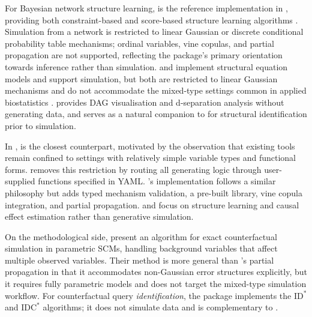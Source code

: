 \documentclass[article]{jss}
\begin{document}
For Bayesian network structure learning,  \citep{scutari2010bnlearn}
is the reference implementation in , providing both constraint-based
and score-based structure learning algorithms \citep{chickering2002optimal,
spirtes2000causation}. Simulation from a  network is restricted to
linear Gaussian or discrete conditional probability table mechanisms; ordinal
variables, vine copulas, and partial propagation are not supported, reflecting the
package's primary orientation towards inference rather than simulation.
 \citep{rosseel2012lavaan} and  \citep{neale2016openmx}
implement structural equation models and support simulation, but both are
restricted to linear Gaussian mechanisms and do not accommodate the mixed-type
settings common in applied biostatistics \citep{lauritzen1989graphical}.
 \citep{textor2016dagitty} provides DAG visualisation and
d-separation analysis \citep{verma1988causal} without generating data, and
serves as a natural companion to  for structural identification
prior to simulation.

In ,  \citep{alhajj2023dagsim} is the closest
counterpart, motivated by the observation that existing tools remain confined to
settings with relatively simple variable types and functional forms. 
removes this restriction by routing all generating logic through user-supplied
functions specified in YAML. 's  implementation
follows a similar philosophy but adds typed mechanism validation, a pre-built
library, vine copula integration, and partial propagation. 
\citep{beaumont2021causalnex} and  \citep{sharma2020dowhy} focus on
structure learning and causal effect estimation rather than generative simulation.

On the methodological side, \citet{karvanen2024simcf} present an algorithm for
exact counterfactual simulation in parametric SCMs, handling background variables
that affect multiple observed variables. Their method is more general than
's partial propagation in that it accommodates non-Gaussian error
structures explicitly, but it requires fully parametric models and does not target
the mixed-type simulation workflow. For counterfactual query \emph{identification},
the  package \citep{tikka2022cfid} implements the $\mathrm{ID}^*$ and
$\mathrm{IDC}^*$ algorithms; it does not simulate data and is complementary to
.
\end{document}
